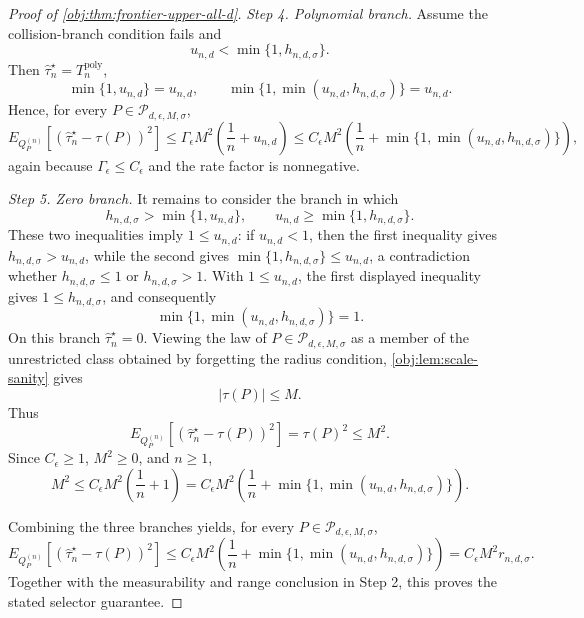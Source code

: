 \begin{proof}[Proof of \cref{obj:thm:frontier-upper-all-d}]
\emph{Step 4. Polynomial branch.}
Assume the collision-branch condition fails and
\[
u_{n,d}<\min\{1,h_{n,d,\sigma}\}.
\]
Then \(\widehat\tau_n^{\star}=T_n^{\mathrm{poly}}\),
\[
\min\{1,u_{n,d}\}=u_{n,d},
\qquad
\min\{1,\min(u_{n,d},h_{n,d,\sigma})\}=u_{n,d}.
\]
Hence, for every \(P\in\mathcal P_{d,\epsilon,M,\sigma}\),
\[
E_{Q_P^{(n)}}\!\left[
\left(\widehat\tau_n^{\star}-\tau(P)\right)^2
\right]
\le
\Gamma_{\epsilon}M^2
\left(\frac1n+u_{n,d}\right)
\le
C_{\epsilon}M^2
\left(\frac1n+\min\{1,\min(u_{n,d},h_{n,d,\sigma})\}\right),
\]
again because \(\Gamma_{\epsilon}\le C_{\epsilon}\) and the rate factor is nonnegative. %

\emph{Step 5. Zero branch.}
It remains to consider the branch in which
\[
h_{n,d,\sigma}>\min\{1,u_{n,d}\},
\qquad
u_{n,d}\ge \min\{1,h_{n,d,\sigma}\}.
\]
These two inequalities imply \(1\le u_{n,d}\): if \(u_{n,d}<1\), then the first inequality gives
\(h_{n,d,\sigma}>u_{n,d}\), while the second gives
\(\min\{1,h_{n,d,\sigma}\}\le u_{n,d}\), a contradiction whether
\(h_{n,d,\sigma}\le1\) or \(h_{n,d,\sigma}>1\).  With \(1\le u_{n,d}\), the first displayed
inequality gives \(1\le h_{n,d,\sigma}\), and consequently
\[
\min\{1,\min(u_{n,d},h_{n,d,\sigma})\}=1.
\]
On this branch \(\widehat\tau_n^{\star}=0\).  Viewing the law of
\(P\in\mathcal P_{d,\epsilon,M,\sigma}\) as a member of the unrestricted class obtained by
forgetting the radius condition, \cref{obj:lem:scale-sanity} gives
\[
|\tau(P)|\le M.
\]
Thus
\[
E_{Q_P^{(n)}}\!\left[
\left(\widehat\tau_n^{\star}-\tau(P)\right)^2
\right]
=
\tau(P)^2
\le M^2.
\]
Since \(C_{\epsilon}\ge1\), \(M^2\ge0\), and \(n\ge1\),
\[
M^2
\le
C_{\epsilon}M^2\left(\frac1n+1\right)
=
C_{\epsilon}M^2
\left(\frac1n+\min\{1,\min(u_{n,d},h_{n,d,\sigma})\}\right).
\] %

Combining the three branches yields, for every
\(P\in\mathcal P_{d,\epsilon,M,\sigma}\),
\[
E_{Q_P^{(n)}}\!\left[
\left(\widehat\tau_n^{\star}-\tau(P)\right)^2
\right]
\le
C_{\epsilon}M^2
\left(\frac1n+\min\{1,\min(u_{n,d},h_{n,d,\sigma})\}\right)
=
C_{\epsilon}M^2 r_{n,d,\sigma}.
\]
Together with the measurability and range conclusion in Step 2, this proves the stated
selector guarantee. %
\end{proof}

